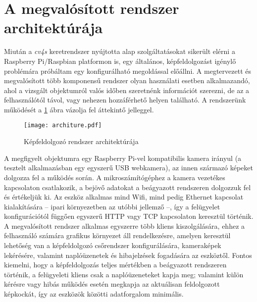 \section{A megvalósított rendszer architektúrája} \label{architektura}

Miután a \emph{cv4s} keretrendszer nyújtotta alap szolgáltatásokat sikerült elérni a Raspberry Pi/Raspbian platformon is, egy általános, képfeldolgozást igénylő problémára próbáltam egy konfigurálható megoldással előállni. A megtervezett és megvalósított több komponensű rendszer olyan használati esetben alkalmazandó, ahol a vizsgált objektumról valós időben szeretnénk információt szerezni, de az a felhasználótól távol, vagy nehezen hozzáférhető helyen található. A rendszerünk működését a \ref{fig:architekture} ábra vázolja fel áttekintő jelleggel.

\begin{figure}[h]
\texttt{[image: architure.pdf]}
\centering
\caption{Képfeldolgozó rendszer architektúrája}
\label{fig:architekture}
\end{figure}

A megfigyelt objektumra egy Raspberry Pi-vel kompatibilis kamera irányul (a tesztelt alkalmazásban egy egyszerű USB webkamera), az innen származó képeket dolgozza fel a működés során. A mikroszámítógéphez a kamera vezetékes kapcsolaton csatlakozik, a bejövő adatokat a beágyazott rendszeren dolgozzuk fel és értékeljük ki. Az eszköz alkalmas mind Wifi, mind pedig Ethernet kapcsolat kialakítására -- ipari környezetben az utóbbi jellemző --, így a felügyelet konfigurációtól függően egyszerű HTTP vagy TCP kapcsolaton keresztül történik. A megvalósított rendszer alkalmas egyszerre több kliens kiszolgálására, ehhez a felhasználó számára grafikus környezet áll rendelkezésre, amelyen keresztül lehetőség van a képfeldolgozó csőrendszer konfigurálására, kameraképek lekérésére, valamint naplóüzenetek és hibajelzések fogadására az eszköztől. Fontos kiemelni, hogy a képfeldolgozás teljes mértékben a beágyazott rendszeren történik, a felügyeleti kliens csak a naplóüzeneteket kapja meg; valamint külön kérésre vagy hibás működés esetén megkapja az aktuálisan feldolgozott képkockát, így az eszközök közötti adatforgalom minimális.
